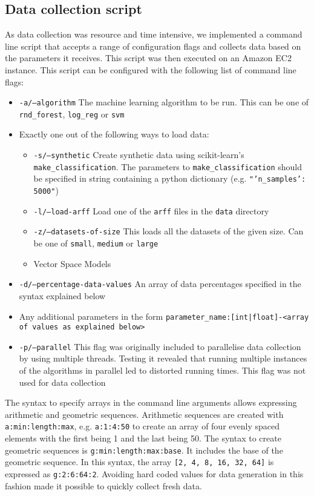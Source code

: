 \documentclass[a4paper,12pt,twoside,openright]{report}
\begin{document}
\subsection{Data collection script}
As data collection was resource and time intensive, we implemented a command line script that accepts a range of configuration flags and collects data based on the parameters it receives. This script was then executed on an Amazon EC2 instance. This script can be configured with the following list of command line flags:

\begin{itemize}
\item \texttt{-a/--algorithm} The machine learning algorithm to be run. This can be one of \texttt{rnd\_forest}, \texttt{log\_reg} or \texttt{svm}
\item Exactly one out of the following ways to load data:
\begin{itemize}[label=$\star$]
        \item \texttt{-s/--synthetic} Create synthetic data using scikit-learn's \texttt{make\_classification}. The parameters to \texttt{make\_classification} should be specified in string containing a python dictionary (e.g. \texttt{"{'n\_samples': 5000}"})
        \item \texttt{-l/--load-arff} Load one of the \texttt{arff} files in the \texttt{data} directory
        \item \texttt{-z/--datasets-of-size} This loads all the datasets of the given size. Can be one of \texttt{small}, \texttt{medium} or \texttt{large}
        \item Vector Space Models
     \end{itemize}
\item \texttt{-d/--percentage-data-values} An array of data percentages specified in the syntax explained below
\item Any additional parameters in the form \texttt{parameter\_name:[int|float]-<array of values as explained below>}
\item \texttt{-p/--parallel} This flag was originally included to parallelise data collection by using multiple threads. Testing it revealed that running multiple instances of the algorithms in parallel led to distorted running times. This flag was not used for data collection
\end{itemize}

The syntax to specify arrays in the command line arguments allows expressing arithmetic and geometric sequences. Arithmetic sequences are created with \texttt{a:min:length:max}, e.g. \texttt{a:1:4:50} to create an array of four evenly spaced elements with the first being 1 and the last being 50. The syntax to create geometric sequences is \texttt{g:min:length:max:base}. It includes the base of the geometric sequence. In this syntax, the array \texttt{[2, 4, 8, 16, 32, 64]} is expressed as \texttt{g:2:6:64:2}. Avoiding hard coded values for data generation in this fashion made it possible to quickly collect fresh data.
	
\end{document}
